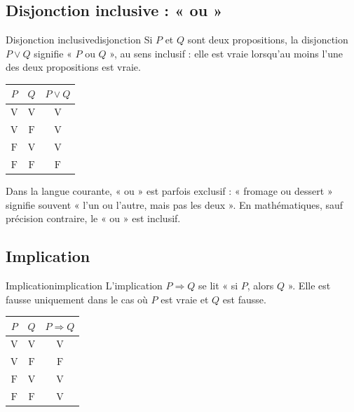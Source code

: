 \documentclass[11pt,a4paper]{article}
\newcommand{\V}{\mathrm{V}}
\newcommand{\F}{\mathrm{F}}
\begin{document}
\subsection{Disjonction inclusive : « ou »}

\begin{definitionbox}{Disjonction inclusive}{disjonction}
Si $P$ et $Q$ sont deux propositions, la disjonction $P\lor Q$ signifie « $P$ ou $Q$ », au sens inclusif : elle est vraie lorsqu'au moins l'une des deux propositions est vraie.
\end{definitionbox}

\begin{center}
\begin{tabular}{c|c|c}
$P$ & $Q$ & $P\lor Q$ \\
\hline
$\V$ & $\V$ & $\V$ \\
$\V$ & $\F$ & $\V$ \\
$\F$ & $\V$ & $\V$ \\
$\F$ & $\F$ & $\F$
\end{tabular}
\end{center}

\begin{remarquebox}
Dans la langue courante, « ou » est parfois exclusif : « fromage ou dessert » signifie souvent « l'un ou l'autre, mais pas les deux ». En mathématiques, sauf précision contraire, le « ou » est inclusif.
\end{remarquebox}

\subsection{Implication}

\begin{definitionbox}{Implication}{implication}
L'implication $P\Rightarrow Q$ se lit « si $P$, alors $Q$ ». Elle est fausse uniquement dans le cas où $P$ est vraie et $Q$ est fausse.
\end{definitionbox}

\begin{center}
\begin{tabular}{c|c|c}
$P$ & $Q$ & $P\Rightarrow Q$ \\
\hline
$\V$ & $\V$ & $\V$ \\
$\V$ & $\F$ & $\F$ \\
$\F$ & $\V$ & $\V$ \\
$\F$ & $\F$ & $\V$
\end{tabular}
\end{center}
\end{document}
